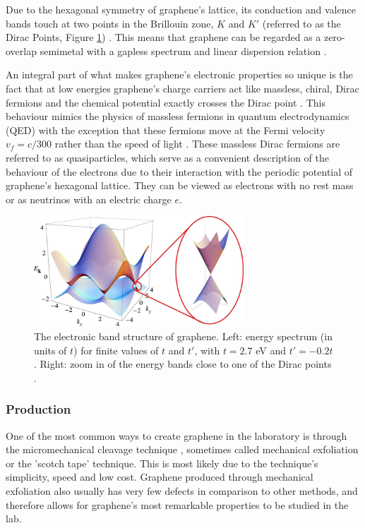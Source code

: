 \documentclass[12pt,titlepage]{article}
\begin{document}
	Due to the hexagonal symmetry of graphene's lattice, its conduction and valence bands touch at two points in the Brillouin zone, $K$ and $K′$ (referred to as the Dirac Points, Figure \ref{fig:bands}) \cite{CastroNeto2009}. This means that graphene can be regarded as a zero-overlap semimetal with a gapless spectrum and linear dispersion relation \cite{Novoselov2011,Katsnelson2006}.
	
	An integral part of what makes graphene’s electronic properties so unique is the fact that at low energies graphene’s charge carriers act like massless, chiral, Dirac fermions and the chemical potential exactly crosses the Dirac point \cite{Katsnelson2006}. This behaviour mimics the physics of massless fermions in quantum electrodynamics (QED) with the exception that these fermions move at the Fermi velocity $v_f = c/300$ rather than the speed of light \cite{CastroNeto2009,Katsnelson2006}. These massless Dirac fermions are referred to as quasiparticles, which serve as a convenient description of the behaviour of the electrons due to their interaction with the periodic potential of graphene’s hexagonal lattice. They can be viewed as electrons with no rest mass or as neutrinos with an electric charge $e$.\cite{Geim2007}
	
	\begin{figure}
		\centering
		\includegraphics[width=0.7\textwidth]{figures/bands.png}
		\caption[The electronic band structure of graphene.]{The electronic band structure of graphene. Left: energy spectrum  (in units of $t$) for finite values of $t$ and $t'$, with $t=2.7$ eV and $t'=−0.2t$. Right: zoom in of the energy bands close to one of the Dirac points \cite{CastroNeto2009}.}
		\label{fig:bands}
	\end{figure}
	
	\subsubsection{Production}
	One of the most common ways to create graphene in the laboratory is through the micromechanical cleavage technique \cite{Novoselov2004}, sometimes called mechanical exfoliation or the 'scotch tape' technique. This is most likely due to the technique's simplicity, speed and low cost. Graphene produced through mechanical exfoliation also usually has very few defects in comparison to other methods, and therefore allows for graphene's most remarkable properties to be studied in the lab.
	
\end{document}
